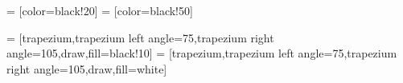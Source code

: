  = [color=black!20]
 = [color=black!50]


%

 = [trapezium,trapezium left angle=75,trapezium right angle=105,draw,fill=black!10]
 = [trapezium,trapezium left angle=75,trapezium right angle=105,draw,fill=white]


%

